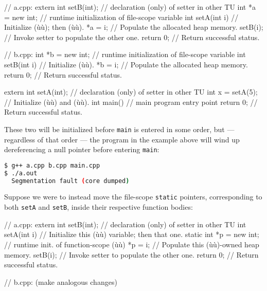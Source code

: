 \begin{emcppslisting}
// a.cpp:
extern int setB(int);  // declaration (only) of setter in other TU
int *a = new int;      // runtime initialization of file-scope variable
int setA(int i)        // Initialize (ù{}ù); then (ù{}ù).
{
    *a = i;            // Populate the allocated heap memory.
    setB(i);           // Invoke setter to populate the other one.
    return 0;          // Return successful status.
}
\end{emcppslisting}
\pagebreak%
\begin{emcppslisting}
// b.cpp:
int *b = new int;      // runtime initialization of file-scope variable
int setB(int i)        // Initialize (ù{}ù).
{
    *b = i;            // Populate the allocated heap memory.
    return 0;          // Return successful status.
}

extern int setA(int);  // declaration (only) of setter in other TU
int x = setA(5);       // Initialize (ù{}ù) and (ù{}ù).
int main()             // main program entry point
{
    return 0;          // Return successful status.
}
\end{emcppslisting}

\noindent These two  will be initialized before \lstinline!main! is
entered in some order, but --- regardless of that order --- the program
in the example above will wind up dereferencing a null pointer
before entering \lstinline!main!:

\begin{lstlisting}[language=bash]
$ g++ a.cpp b.cpp main.cpp
$ ./a.out
  Segmentation fault (core dumped)
\end{lstlisting}

\noindent Suppose we were to instead move the file-scope \lstinline!static! pointers,
corresponding to both \lstinline!setA! and \lstinline!setB!, inside their
respective function bodies:

\begin{emcppslisting}
// a.cpp:
extern int setB(int);  // declaration (only) of setter in other TU
int setA(int i)        // Initialize this (ù{}ù) variable; then that one.
{
    static int *p = new int;  // runtime init. of function-scope (ù{}ù)
    *p = i;                   // Populate this (ù{}ù)-owned heap memory.
    setB(i);                  // Invoke setter to populate the other one.
    return 0;                 // Return successful status.
}

// b.cpp: (make analogous changes)
\end{emcppslisting}

